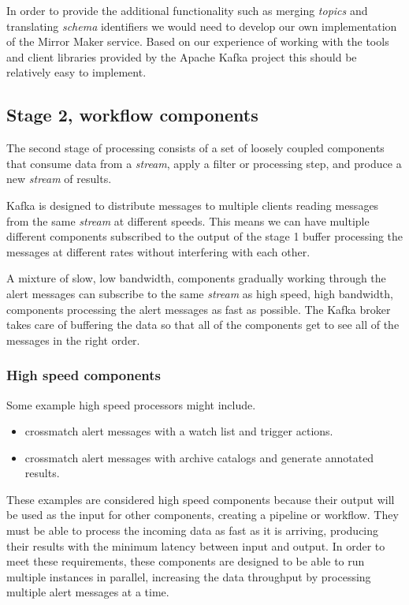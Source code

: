 \documentclass{article}
\newcommand{\kafka} {Kafka\xspace}
\newcommand{\kftopics} {\textit{topics}\xspace}
\newcommand{\kfstream} {\textit{stream}\xspace}
\newcommand{\apache} {Apache\xspace}
\newcommand{\crossmatch} {crossmatch\xspace}
\newcommand{\catalogs} {catalogs\xspace}
\newcommand{\avschema} {\textit{schema}\xspace}
\newcommand{\mirrormaker} {Mirror Maker\xspace}
\newcommand{\stageone} {stage 1\xspace}
\begin{document}
In order to provide the additional functionality such as merging \kftopics and translating \avschema identifiers  we would need to develop our own implementation of the \mirrormaker service.
Based on our experience of working with the tools and client libraries provided by the \apache \kafka project this should be relatively easy to implement.

\subsection{Stage 2, workflow components}
\label{stage-2}
The second stage of processing consists of a set of loosely coupled components that consume data from a \kfstream, apply a filter or processing step, and produce a new \kfstream of results.

\kafka is designed to distribute messages to multiple clients reading messages from the same \kfstream at different speeds. This means we can have multiple different components subscribed to the output of the \stageone buffer processing the messages at different rates without interfering with each other.

A mixture of slow, low bandwidth, components gradually working through the alert messages can subscribe to the same \kfstream as high speed, high bandwidth, components processing the alert messages as fast as possible. The \kafka broker takes care of buffering the data so that all of the components get to see all of the messages in the right order.

\subsubsection{High speed components}
\label{stage-2.high-speed.components}

Some example high speed processors might include.
\begin{itemize}
  \item \crossmatch alert messages with a watch list and trigger actions.
  \item \crossmatch alert messages with archive \catalogs and generate annotated results.
\end{itemize}

These examples are considered high speed components because their output will be used as the input for other components, creating a pipeline or workflow.
They must be able to process the incoming data as fast as it is arriving, producing their results with the minimum latency between input and output.
In order to meet these requirements, these components are designed to be able to run multiple instances in parallel, increasing the data throughput by processing multiple alert messages at a time.
\end{document}
